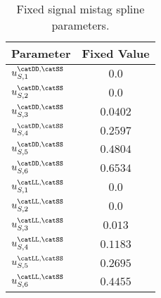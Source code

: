\begin{table}[h]
\caption{Fixed signal \SSpi mistag spline parameters.}
\label{tab:app:measurement_of_sin2beta:cpv_measurement:fixed_parameters:eta:sig:ss}
\centering
\begin{tabular}{lr@{$\,\pm\,$}l}
  \toprule
  Parameter                      & \multicolumn{2}{c}{Fixed Value} \\
  \midrule
  $u_{S,1}^\text{\catDD,\catSS}$ & \multicolumn{2}{c}{$0.0$}\\
  $u_{S,2}^\text{\catDD,\catSS}$ & \multicolumn{2}{c}{$0.0$}\\
  $u_{S,3}^\text{\catDD,\catSS}$ & \multicolumn{2}{c}{$0.0402$}\\
  $u_{S,4}^\text{\catDD,\catSS}$ & \multicolumn{2}{c}{$0.2597$}\\
  $u_{S,5}^\text{\catDD,\catSS}$ & \multicolumn{2}{c}{$0.4804$}\\
  $u_{S,6}^\text{\catDD,\catSS}$ & \multicolumn{2}{c}{$0.6534$}\\
  $u_{S,1}^\text{\catLL,\catSS}$ & \multicolumn{2}{c}{$0.0$}\\
  $u_{S,2}^\text{\catLL,\catSS}$ & \multicolumn{2}{c}{$0.0$}\\
  $u_{S,3}^\text{\catLL,\catSS}$ & \multicolumn{2}{c}{$0.013$}\\
  $u_{S,4}^\text{\catLL,\catSS}$ & \multicolumn{2}{c}{$0.1183$}\\
  $u_{S,5}^\text{\catLL,\catSS}$ & \multicolumn{2}{c}{$0.2695$}\\
  $u_{S,6}^\text{\catLL,\catSS}$ & \multicolumn{2}{c}{$0.4455$}\\
  \bottomrule
\end{tabular}
\end{table}
%
